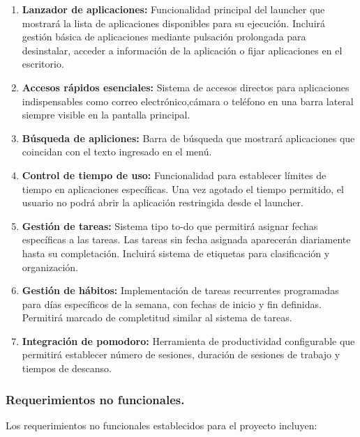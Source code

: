 \begin{enumerate}
    \item \textbf{Lanzador de aplicaciones:} Funcionalidad principal del launcher que mostrará la lista de aplicaciones disponibles para su ejecución. Incluirá gestión básica de aplicaciones mediante pulsación prolongada para desinstalar, acceder a información de la aplicación o fijar aplicaciones en el escritorio.
    
    \item \textbf{Accesos rápidos esenciales:} Sistema de accesos directos para aplicaciones indispensables como correo electrónico,cámara o teléfono en una barra lateral siempre visible en la pantalla principal.
    
    \item \textbf{Búsqueda de apliciones:} Barra de búsqueda que mostrará aplicaciones que coincidan con el texto ingresado en el menú.
    
    \item \textbf{Control de tiempo de uso:} Funcionalidad para establecer límites de tiempo en aplicaciones específicas. Una vez agotado el tiempo permitido, el usuario no podrá abrir la aplicación restringida desde el launcher.
    
    \item \textbf{Gestión de tareas:} Sistema tipo to-do que permitirá asignar fechas específicas a las tareas. Las tareas sin fecha asignada aparecerán diariamente hasta su completación. Incluirá sistema de etiquetas para clasificación y organización.
    
    \item \textbf{Gestión de hábitos:} Implementación de tareas recurrentes programadas para días específicos de la semana, con fechas de inicio y fin definidas. Permitirá marcado de completitud similar al sistema de tareas.
    
    \item \textbf{Integración de pomodoro:} Herramienta de productividad configurable que permitirá establecer número de sesiones, duración de sesiones de trabajo y tiempos de descanso.
\end{enumerate}

\subsubsection{Requerimientos no funcionales.}

Los requerimientos no funcionales establecidos para el proyecto incluyen:

